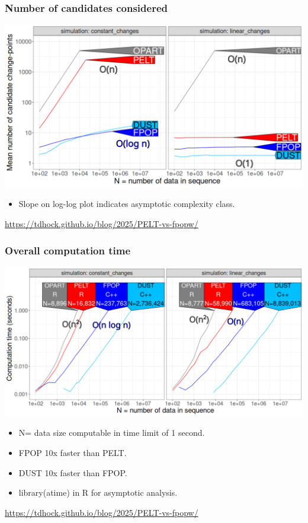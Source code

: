\documentclass{beamer}
\begin{document}
\begin{frame}
  \frametitle{Number of candidates considered}
  \includegraphics[width=\textwidth]{figure-pred-candidates-O.png}
 
  \begin{itemize}
  \item Slope on log-log plot indicates asymptotic complexity class.
  \end{itemize}

  \url{https://tdhock.github.io/blog/2025/PELT-vs-fpopw/}
\end{frame}

\begin{frame}
  \frametitle{Overall computation time}
  \includegraphics[width=\textwidth]{figure-pred-seconds-O.png}

  \begin{itemize}
  \item N= data size computable in time limit of 1 second.
  \item FPOP 10x faster than PELT.
  \item DUST 10x faster than FPOP.
  \item library(atime) in R for asymptotic analysis.
  \end{itemize}

  \url{https://tdhock.github.io/blog/2025/PELT-vs-fpopw/}
\end{frame}
\end{document}

